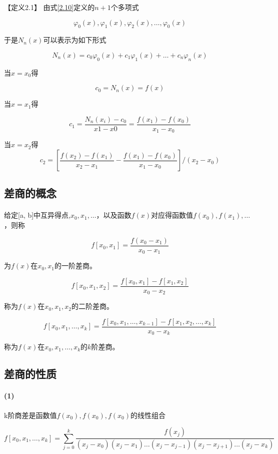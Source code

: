 \documentclass[12pt]{report}
\begin{document}
【定义2.1】 \quad 由式\eqref{2.10}定义的$n+1$个多项式

\[
	\varphi_0(x), \varphi_1(x), \varphi_2(x),\dots,\varphi_0(x)
\]

于是$N_n(x)$可以表示为如下形式

\[
	N_n(x) = c_0 \varphi_0(x) + c_1 \varphi_1(x) + \ldots + c_n \varphi_n(x)
\]

当$x = x_0$得
	
\[
	c_0 = N_n(x) = f(x)
\]

当$x = x_1$得

\[
	c_1 = \frac{N_n(x_i) - c_0}{x1 - x0} = \frac{f(x_1) - f(x_0)}{x_1 - x_0}
\]

当$x = x_2$得
\[
	c_2 = \left[\frac{f(x_2) - f(x_1)}{x_2 - x_1} - \frac{f(x_1) - f(x_0)}{x_1 - x_0}  \right]/(x_2 - x_0) 
\]


\subsection{差商的概念}

\paragraph{ } 给定[a, b]中互异得点,$x_0, x_1, \ldots $，以及函数$f(x)$对应得函数值$f(x_0), f(x_1), \ldots$，则称

\[
	f[x_0, x_1]=\frac{f(x_0 - x_1)}{x_0 - x_1}
\]

为$f(x)$在$x_0, x_1$的一阶差商。

\[
	f[x_0, x_1, x_2] = \frac{f[x_0, x_1] - f[x_1, x_2]}{x_0 - x_2}
\]

称为$f(x)$在$x_0, x_1, x_2$的二阶差商。

\[
	f[x_0, x_1, \ldots , x_k] = \frac{f[x_0, x_1, \ldots , x_{k-1}] - f[x_1, x_2, \ldots , x_k]}{x_0 - x_k}
\]

称为$f(x)$在$x_0, x_1, \ldots , x_k$的$k$阶差商。


\subsection{差商的性质}


\paragraph{(1)} k阶商差是函数值$f(x_0),f(x_0),f(x_0)$的线性组合

\[
	f[x_0, x_1, \ldots , x_k] = \sum_{j=0}^k \frac{f(x_j)}{(x_j - x_0)(x_j - x_1)\ldots (x_j - x_{j-1})(x_j - x_{j+1})\ldots (x_j - x_k)}
\]
\end{document}
